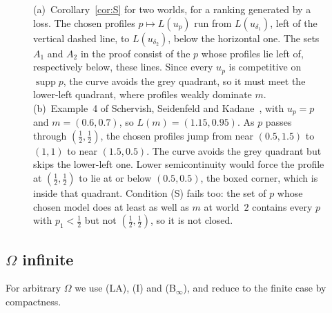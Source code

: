 \documentclass[11pt]{article}
\theoremstyle{definition}
\theoremstyle{remark}
\newcommand{\supp}{\operatorname{supp}}
\begin{document}
\begin{figure}[ht]
\caption{(a)~Corollary~\ref{cor:S} for two worlds, for a ranking generated by a loss. The chosen profiles $p\mapsto L(u_p)$ run from $L(u_{\delta_1})$, left of the vertical dashed line, to $L(u_{\delta_2})$, below the horizontal one. The sets $A_1$ and $A_2$ in the proof consist of the $p$ whose profiles lie left of, respectively below, these lines. Since every $u_p$ is competitive on $\supp p$, the curve avoids the grey quadrant, so it must meet the lower-left quadrant, where profiles weakly dominate $m$. (b)~Example~4 of Schervish, Seidenfeld and Kadane~\cite{SSK09}, with $u_p=p$ and $m=(0.6,0.7)$, so $L(m)=(1.15,0.95)$. As $p$ passes through $(\tfrac12,\tfrac12)$, the chosen profiles jump from near $(0.5,1.5)$ to $(1,1)$ to near $(1.5,0.5)$. The curve avoids the grey quadrant but skips the lower-left one. Lower semicontinuity would force the profile at $(\tfrac12,\tfrac12)$ to lie at or below $(0.5,0.5)$, the boxed corner, which is inside that quadrant. Condition (S) fails too: the set of $p$ whose chosen model does at least as well as $m$ at world~$2$ contains every $p$ with $p_1<\tfrac12$ but not $(\tfrac12,\tfrac12)$, so it is not closed.}
\label{fig:profiles}
\end{figure}

\subsection{\texorpdfstring{$\Omega$}{Omega} infinite}\label{sec:infinite}
For arbitrary $\Omega$ we use (LA), (I) and (B$_\infty$), and reduce to the finite case by compactness.
\end{document}

